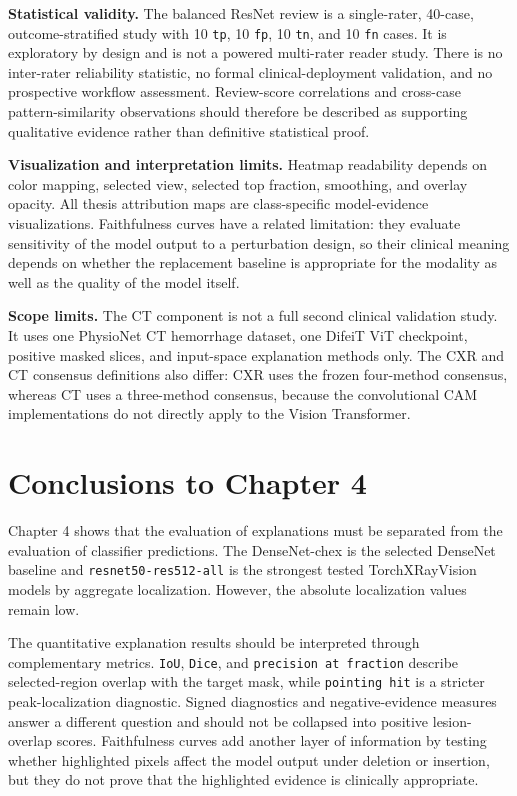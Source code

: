 \textbf{Statistical validity.} The balanced ResNet review is a
single-rater, 40-case, outcome-stratified study with 10 \texttt{tp}, 10
\texttt{fp}, 10 \texttt{tn}, and 10 \texttt{fn} cases. It is exploratory
by design and is not a powered multi-rater reader study. There is no
inter-rater reliability statistic, no formal clinical-deployment
validation, and no prospective workflow assessment. Review-score
correlations and cross-case pattern-similarity observations should
therefore be described as supporting qualitative evidence rather than
definitive statistical proof. 

\textbf{Visualization and interpretation limits.} Heatmap readability
depends on color mapping, selected view, selected top fraction,
smoothing, and overlay opacity. All thesis attribution maps are
class-specific model-evidence visualizations. 
Faithfulness curves have a related limitation: they
evaluate sensitivity of the model output to a perturbation design, so
their clinical meaning depends on whether the replacement baseline is
appropriate for the modality as well as the quality of the model itself.

\textbf{Scope limits.} The CT component is not a full
second clinical validation study. It uses one PhysioNet CT hemorrhage
dataset, one DifeiT ViT checkpoint, positive masked slices, and
input-space explanation methods only. The CXR and CT consensus
definitions also differ: CXR uses the frozen four-method consensus,
whereas CT uses a three-method consensus, because the convolutional CAM
implementations do not directly apply to the Vision Transformer.

\hypertarget{conclusions-to-chapter-4}{%
	\section*{Conclusions to Chapter 4}\label{conclusions-to-chapter-4}}

Chapter 4 shows that the evaluation of explanations must be separated
from the evaluation of classifier predictions. The 
DenseNet-chex is the selected DenseNet baseline and
\texttt{resnet50-\allowbreak res512-\allowbreak all} is the strongest tested TorchXRayVision
models by aggregate localization. However, the absolute localization
values remain low.

The quantitative explanation results should be interpreted through
complementary metrics. \texttt{IoU}, \texttt{Dice}, and
\texttt{precision \allowbreak at \allowbreak fraction} describe selected-region overlap with
the target mask, while \texttt{pointing \allowbreak hit} is a stricter
peak-localization diagnostic. Signed diagnostics and negative-evidence
measures answer a different question and should not be collapsed into
positive lesion-overlap scores. Faithfulness curves add another layer
of information by
testing whether highlighted pixels affect the model output under
deletion or insertion, but they do not prove that the highlighted
evidence is clinically appropriate.

